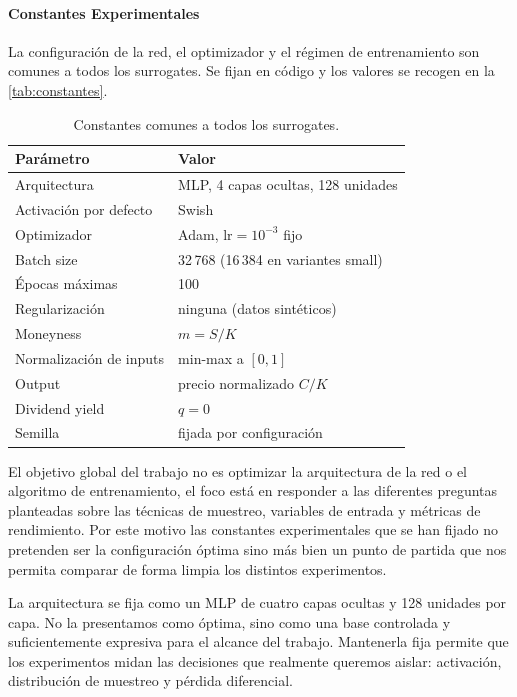 \documentclass[11pt,a4paper]{article}
\begin{document}
\paragraph{Constantes Experimentales}
La configuración de la red, el optimizador y el régimen de entrenamiento son comunes a todos los surrogates. Se fijan en código y los valores se recogen en la \autoref{tab:constantes}.

\begin{table}[ht]
\centering
\small
\begin{tabular}{ll}
\toprule
Parámetro & Valor \\
\midrule
Arquitectura & MLP, 4 capas ocultas, 128 unidades \\
Activación por defecto & Swish \\
Optimizador & Adam, $\text{lr}=10^{-3}$ fijo \\
Batch size & 32\,768 (16\,384 en variantes small) \\
Épocas máximas & 100 \\
Regularización & ninguna (datos sintéticos) \\
Moneyness & $m = S/K$ \\
Normalización de inputs & min-max a $[0, 1]$ \\
Output & precio normalizado $C/K$ \\
Dividend yield & $q = 0$ \\
Semilla & fijada por configuración \\
\bottomrule
\end{tabular}
\caption{Constantes comunes a todos los surrogates.}
\label{tab:constantes}
\end{table}

El objetivo global del trabajo no es optimizar la arquitectura de la red o el algoritmo de entrenamiento, el foco está en responder a las diferentes preguntas planteadas sobre las técnicas de muestreo, variables de entrada y métricas de rendimiento. Por este motivo las constantes experimentales que se han fijado no pretenden ser la configuración óptima sino más bien un punto de partida que nos permita comparar de forma limpia los distintos experimentos.

La arquitectura se fija como un MLP de cuatro capas ocultas y 128 unidades por capa. No la presentamos como óptima, sino como una base controlada y suficientemente expresiva para el alcance del trabajo. Mantenerla fija permite que los experimentos midan las decisiones que realmente queremos aislar: activación, distribución de muestreo y pérdida diferencial.
\end{document}
